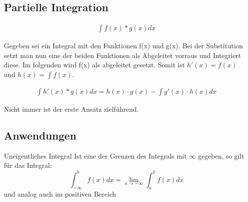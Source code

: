 \documentclass[german]{latex4ei/latex4ei_sheet}
\begin{document}
\begin{sectionbox}
\subsection{Partielle Integration}

    \begin{align*}
        \int f(x) * g(x) dx
    \end{align*}
    
Gegeben sei ein Integral mit den Funktionen f(x) und g(x). Bei der Substitution setzt man nun eine der beiden Funktionen als Abgeleitet vorraus und Integriert diese. Im folgenden wird f(x) als abgeleitet gesetzt. Somit ist $h'(x) = f(x)$ und $h(x) = \int f(x)$.

    \begin{align*}
        \int h'(x) * g(x) dx = h(x) \cdot g(x) - \int g'(x) \cdot h(x) dx
    \end{align*}

Nicht immer ist der erste Ansatz zielführend.

\subsection{Anwendungen}
\begin{cookbox} {Uneigentliches Integral}
Ist eine der Grenzen des Integrals mit $\infty$ gegeben, so gilt für das Integral: \\
$$\int_{-\infty}^{b} f(x)dx = \lim_{a\to-\infty}\int_{a}^{b}f(x)dx $$ 
und analog auch im positiven Bereich
    
\end{cookbox}

\end{sectionbox}
\end{document}
